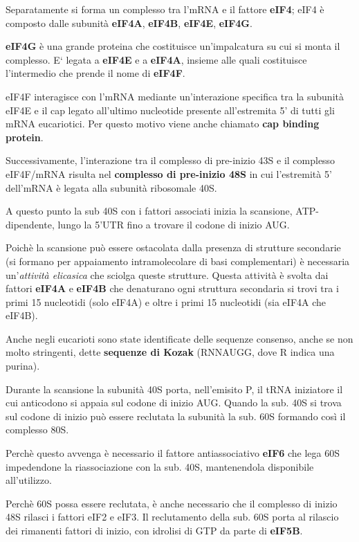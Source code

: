 \documentclass[11pt]{book}
\begin{document}
Separatamente si forma un complesso tra l'mRNA e il fattore
\textbf{eIF4}; eIF4 è composto dalle subunità \textbf{eIF4A},
\textbf{eIF4B}, \textbf{eIF4E}, \textbf{eIF4G}.

\textbf{eIF4G} è una grande proteina che costituisce un'impalcatura su
cui si monta il complesso. E` legata a \textbf{eIF4E} e a
\textbf{eIF4A}, insieme alle quali costituisce l'intermedio che prende
il nome di \textbf{eIF4F}.

eIF4F interagisce con l'mRNA mediante un'interazione specifica tra la
subunità eIF4E e il cap legato all'ultimo nucleotide presente
all'estremita 5' di tutti gli mRNA eucariotici. Per questo motivo viene
anche chiamato \textbf{cap binding protein}.

Successivamente, l'interazione tra il complesso di pre-inizio 43S e il
complesso eIF4F/mRNA risulta nel \textbf{complesso di pre-inizio 48S} in
cui l'estremità 5' dell'mRNA è legata alla subunità ribosomale 40S.

A questo punto la sub 40S con i fattori associati inizia la scansione,
ATP-dipendente, lungo la 5'UTR fino a trovare il codone di inizio AUG.

Poichè la scansione può essere ostacolata dalla presenza di strutture
secondarie (si formano per appaiamento intramolecolare di basi
complementari) è necessaria un'\emph{attività elicasica} che sciolga
queste strutture. Questa attività è svolta dai fattori \textbf{eIF4A} e
\textbf{eIF4B} che denaturano ogni struttura secondaria si trovi tra i
primi 15 nucleotidi (solo eIF4A) e oltre i primi 15 nucleotidi (sia
eIF4A che eIF4B).

Anche negli eucarioti sono state identificate delle sequenze consenso,
anche se non molto stringenti, dette \textbf{sequenze di Kozak}
(RNNAUGG, dove R indica una purina).

Durante la scansione la subunità 40S porta, nell'emisito P, il tRNA
iniziatore il cui anticodono si appaia sul codone di inizio AUG. Quando
la sub. 40S si trova sul codone di inizio può essere reclutata la
subunità la sub. 60S formando così il complesso 80S.

Perchè questo avvenga è necessario il fattore antiassociativo
\textbf{eIF6} che lega 60S impedendone la riassociazione con la sub.
40S, mantenendola disponibile all'utilizzo.

Perchè 60S possa essere reclutata, è anche necessario che il complesso
di inizio 48S rilasci i fattori eIF2 e eIF3. Il reclutamento della sub.
60S porta al rilascio dei rimanenti fattori di inizio, con idrolisi di
GTP da parte di \textbf{eIF5B}.
\end{document}
